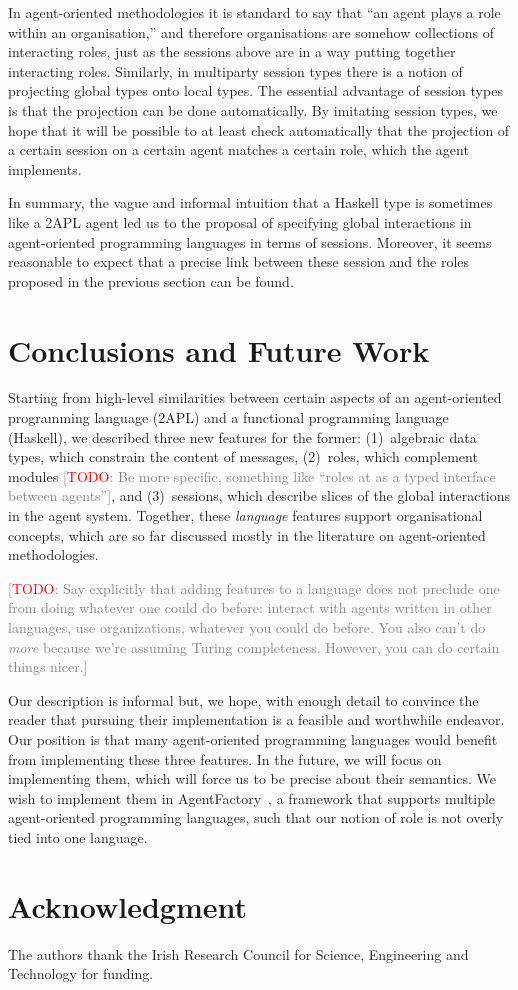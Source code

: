 \documentclass[conference,compsoc]{IEEEtran} %
\newcommand{\todo}[1]{{\small \textcolor{gray}{[\textcolor{red}{TODO}: #1]}}}
\begin{document}
In agent-oriented methodologies it is standard to say that ``an agent plays
a role within an organisation,'' and therefore organisations are somehow
collections of interacting roles, just as the sessions above are in a way
putting together interacting roles. Similarly, in multiparty session types
there is a notion of projecting global types onto local types. The
essential advantage of session types is that the projection can be done
automatically. By imitating session types, we hope that it will be possible
to at least check automatically that the projection of a certain session on
a certain agent matches a certain role, which the agent implements.

In summary, the vague and informal intuition that a Haskell type is
sometimes like a 2APL agent led us to the proposal of specifying global
interactions in agent-oriented programming languages in terms of sessions.
Moreover, it seems reasonable to expect that a precise link between these
session and the roles proposed in the previous section can be found.

\section{Conclusions and Future Work} %

Starting from high-level similarities between certain aspects of an
agent-oriented programming language (2APL) and a functional programming
language (Haskell), we described three new features for the former:
(1)~algebraic data types, which constrain the content of messages,
(2)~roles, which complement modules \todo{Be more specific, something like
``roles at as a typed interface between agents''}, and (3)~sessions, which
describe slices of the global interactions in the agent system. Together,
these \emph{language} features support organisational concepts, which are
so far discussed mostly in the literature on agent-oriented methodologies.

\todo{Say explicitly that adding features to a language does not preclude
one from doing whatever one could do before: interact with agents written
in other languages, use organizations, whatever you could do before. You
also can't do \emph{more} because we're assuming Turing completeness.
However, you can do certain things nicer.}

Our description is informal but, we hope, with enough detail to convince
the reader that pursuing their implementation is a feasible and worthwhile
endeavor. Our position is that many agent-oriented programming languages
would benefit from implementing these three features. In the future, we
will focus on implementing them, which will force us to be precise about
their semantics. We wish to implement them in AgentFactory~\cite{phd:rem},
a framework that supports multiple agent-oriented programming languages,
such that our notion of role is not overly tied into one language.

\section*{Acknowledgment}

The authors thank the Irish Research Council for Science, Engineering and
Technology for funding.




\end{document}
